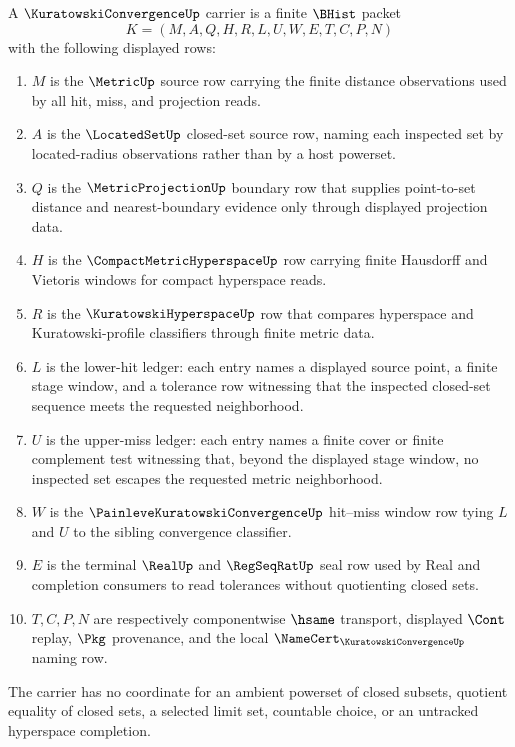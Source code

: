 \begin{definition}
\label{def:kuratowski-convergence-carrier}
A $\KuratowskiConvergenceUp$ carrier is a finite $\BHist$ packet
$$
K=(M,A,Q,H,R,L,U,W,E,T,C,P,N)
$$
with the following displayed rows:
\begin{enumerate}
\item $M$ is the $\MetricUp$ source row carrying the finite distance observations used by all hit, miss, and projection reads.
\item $A$ is the $\LocatedSetUp$ closed-set source row, naming each inspected set by located-radius observations rather than by a host powerset.
\item $Q$ is the $\MetricProjectionUp$ boundary row that supplies point-to-set distance and nearest-boundary evidence only through displayed projection data.
\item $H$ is the $\CompactMetricHyperspaceUp$ row carrying finite Hausdorff and Vietoris windows for compact hyperspace reads.
\item $R$ is the $\KuratowskiHyperspaceUp$ row that compares hyperspace and Kuratowski-profile classifiers through finite metric data.
\item $L$ is the lower-hit ledger: each entry names a displayed source point, a finite stage window, and a tolerance row witnessing that the inspected closed-set sequence meets the requested neighborhood.
\item $U$ is the upper-miss ledger: each entry names a finite cover or finite complement test witnessing that, beyond the displayed stage window, no inspected set escapes the requested metric neighborhood.
\item $W$ is the $\PainleveKuratowskiConvergenceUp$ hit--miss window row tying $L$ and $U$ to the sibling convergence classifier.
\item $E$ is the terminal $\RealUp$ and $\RegSeqRatUp$ seal row used by Real and completion consumers to read tolerances without quotienting closed sets.
\item $T,C,P,N$ are respectively componentwise $\hsame$ transport, displayed $\Cont$ replay, $\Pkg$ provenance, and the local $\NameCert_{\KuratowskiConvergenceUp}$ naming row.
\end{enumerate}
The carrier has no coordinate for an ambient powerset of closed subsets, quotient equality of closed sets, a selected limit set, countable choice, or an untracked hyperspace completion.
\end{definition}

